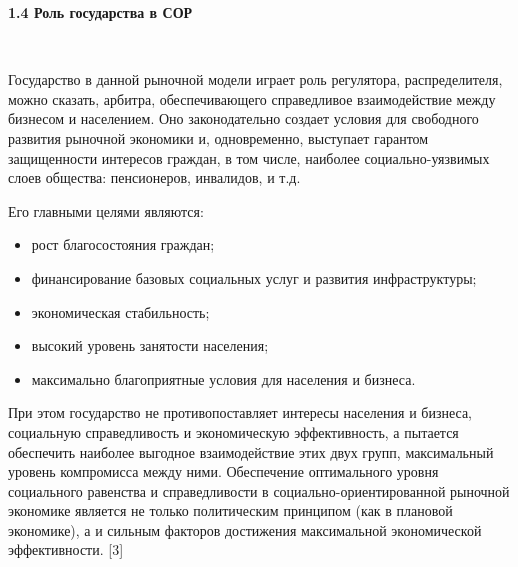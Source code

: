 \documentclass[14pt,a4paper]{article}
\begin{document}
    \begin{center}
        \textbf{1.4 Роль государства в СОР}
    \end{center}
    \\
    \par
    Государство в данной рыночной модели играет роль регулятора, распределителя,
    можно сказать, арбитра, обеспечивающего справедливое взаимодействие между бизнесом и
    населением. Оно законодательно создает условия для свободного развития рыночной экономики и,
    одновременно, выступает гарантом защищенности интересов граждан, в том числе, наиболее
    социально-уязвимых слоев общества: пенсионеров, инвалидов, и т.д.
    \par
    Его главными целями являются:
    \begin{itemize}
        \item рост благосостояния граждан;
        \item финансирование базовых социальных услуг и развития инфраструктуры;
        \item экономическая стабильность;
        \item высокий уровень занятости населения;
        \item максимально благоприятные условия для населения и бизнеса.
    \end{itemize}
    \par
    При этом государство не противопоставляет интересы населения и бизнеса, социальную
    справедливость и экономическую эффективность, а пытается обеспечить наиболее выгодное
    взаимодействие этих двух групп, максимальный уровень компромисса между ними.
    Обеспечение оптимального уровня социального равенства и справедливости в
    социально-ориентированной рыночной экономике является не только политическим принципом
    (как в плановой экономике), а и сильным факторов достижения максимальной экономической
    эффективности. [3]
    \par
\end{document}
